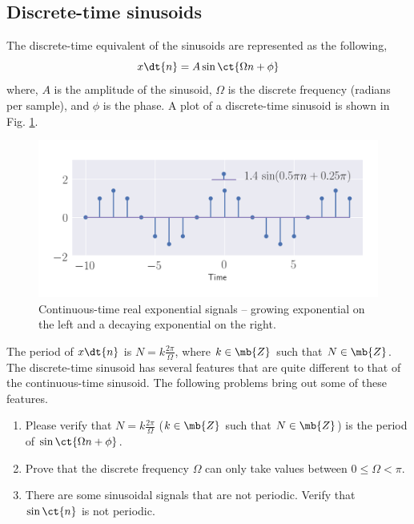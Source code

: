 \subsection{Discrete-time sinusoids}
The discrete-time equivalent of the sinusoids are represented as the following,
\[ x\dt{n} = A \sin \ct{\Omega n + \phi} \]
\noindent where, $A$ is the amplitude of the sinusoid, $\Omega$ is the discrete frequency (radians per sample), and $\phi$ is the phase. A plot of a discrete-time sinusoid is shown in Fig. \ref{fig:ch2-discsine}.

\begin{figure}[h]
    \centering
    \includegraphics[width=\columnwidth]{figs/ch2-discsine.png}
    \caption{Continuous-time real exponential signals -- growing exponential on the left and a decaying exponential on the right.} \label{fig:ch2-discsine}
\end{figure}

The period of $x\dt{n}$ is $N = k\frac{2\pi}{\Omega}$, where $k \in \mb{Z}$ such that $N \in \mb{Z}$. The discrete-time sinusoid has several features that are quite different to that of the continuous-time sinusoid. The following problems bring out some of these features.

\begin{problem*}[frametitle=Discrete-time sinusoidal signals]
    \begin{enumerate}
        \item Please verify that $N = k\frac{2\pi}{\Omega}$ ($k \in \mb{Z}$ such that $N \in \mb{Z}$) is the period of $\sin \ct{\Omega n + \phi}$.
        \item Prove that the discrete frequency $\Omega$ can only take values between $0 \leq \Omega < \pi$. 
        \item There are some sinusoidal signals that are not periodic. Verify that $\sin \ct{n}$ is not periodic. 
    \end{enumerate}
\end{problem*}

